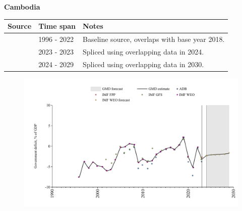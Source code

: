 \documentclass[12pt,a4paper,landscape]{article}
\begin{document}
\begin{adjustbox}{max totalsize={\paperwidth}{\paperheight},center}
\begin{minipage}[t][\textheight][t]{\textwidth}
\vspace*{0.5cm}
{}
\begin{center}
{\Large\bfseries Cambodia}
\end{center}
\vspace{0.5cm}
\begin{table}[H]
\centering
\small
\begin{tabular}{|l|l|l|}
\hline
\textbf{Source} & \textbf{Time span} & \textbf{Notes} \\
\hline
\rowcolor{white}\cite{IMF_WEO}& 1996 - 2022 &Baseline source, overlaps with base year 2018.\\
\rowcolor{lightgray}\cite{IMF_GFS}& 2023 - 2023 &Spliced using overlapping data in 2024.\\
\rowcolor{white}\cite{IMF_WEO_forecast}& 2024 - 2029 &Spliced using overlapping data in 2030.\\
\hline
\end{tabular}
\end{table}
\begin{figure}[H]
\centering
\includegraphics[width=\textwidth,height=0.6\textheight,keepaspectratio]{graphs/KHM_govdef_GDP.pdf}
\end{figure}
\end{minipage}
\end{adjustbox}
\end{document}
